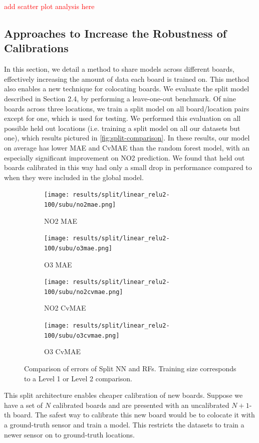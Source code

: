 \documentclass[journal abbreviation, manuscript]{copernicus}
\newcommand\todo[1]{\textcolor{red}{#1}}
\begin{document}
\todo{add scatter plot analysis here}

\subsection{Approaches to Increase the Robustness of Calibrations}

In this section, we detail a method to share models across different boards, effectively increasing the amount of data each board is trained on. This method also enables a new technique for colocating boards. We evaluate the split model described in Section 2.4, by performing a leave-one-out benchmark. Of nine boards across three locations, we train a split model on all board/location pairs except for one, which is used for testing. 
We performed this evaluation on all possible held out locations (i.e. training a split model on all our datasets but one), which results pictured in \autoref{fig:split-comparison}.
In these results, our model on average has lower MAE and CvMAE than the random forest model, with an especially significant improvement on NO2 prediction. We found that held out boards calibrated in this way had only a small drop in performance compared to when they were included in the global model.

\begin{figure}[H]
\begin{subfigure}{0.49\textwidth}
\texttt{[image: results/split/linear\_relu2-100/subu/no2mae.png]}
\caption{NO2 MAE}
\end{subfigure}
\begin{subfigure}{0.49\textwidth}
\texttt{[image: results/split/linear\_relu2-100/subu/o3mae.png]}
\caption{O3 MAE}
\end{subfigure}
\begin{subfigure}{0.49\textwidth}
\texttt{[image: results/split/linear\_relu2-100/subu/no2cvmae.png]}
\caption{NO2 CvMAE}
\end{subfigure}
\begin{subfigure}{0.49\textwidth}
\texttt{[image: results/split/linear\_relu2-100/subu/o3cvmae.png]}
\caption{O3 CvMAE}
\end{subfigure}
\caption{Comparison of errors of Split NN and RFs. Training size corresponds to a Level 1 or Level 2 comparison.}
\label{fig:split-comparison}
\end{figure}

This split architecture enables cheaper calibration of new boards. 
Suppose we have a set of $N$ calibrated boards and are presented with an uncalibrated $N + 1$-th board. The safest way to calibrate this new board would be to colocate it with a ground-truth sensor and train a model. This restricts the datasets to train a newer sensor on to ground-truth locations. 
\end{document}
